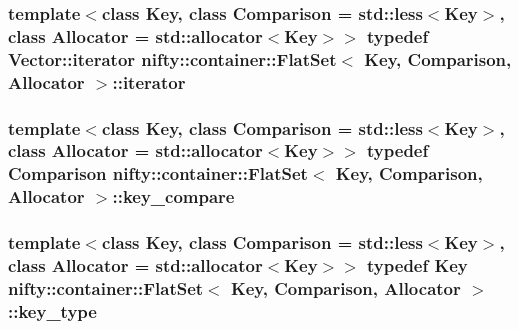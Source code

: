 \subsubsection[{iterator}]{\setlength{\rightskip}{0pt plus 5cm}template$<$class Key, class Comparison = std\+::less$<$\+Key$>$, class Allocator = std\+::allocator$<$\+Key$>$$>$ typedef Vector\+::iterator {\bf nifty\+::container\+::\+Flat\+Set}$<$ Key, Comparison, Allocator $>$\+::{\bf iterator}}\label{classnifty_1_1container_1_1FlatSet_a9c7fd20cd6b1878ccb8a7e068072c795}
\hypertarget{classnifty_1_1container_1_1FlatSet_ab88802e81d77a08a7a74e8ba9d2083c7}{}
\subsubsection[{key\+\_\+compare}]{\setlength{\rightskip}{0pt plus 5cm}template$<$class Key, class Comparison = std\+::less$<$\+Key$>$, class Allocator = std\+::allocator$<$\+Key$>$$>$ typedef Comparison {\bf nifty\+::container\+::\+Flat\+Set}$<$ Key, Comparison, Allocator $>$\+::{\bf key\+\_\+compare}}\label{classnifty_1_1container_1_1FlatSet_ab88802e81d77a08a7a74e8ba9d2083c7}
\hypertarget{classnifty_1_1container_1_1FlatSet_a0101a4574052389646be8d9bf092a949}{}
\subsubsection[{key\+\_\+type}]{\setlength{\rightskip}{0pt plus 5cm}template$<$class Key, class Comparison = std\+::less$<$\+Key$>$, class Allocator = std\+::allocator$<$\+Key$>$$>$ typedef Key {\bf nifty\+::container\+::\+Flat\+Set}$<$ Key, Comparison, Allocator $>$\+::{\bf key\+\_\+type}}\label{classnifty_1_1container_1_1FlatSet_a0101a4574052389646be8d9bf092a949}
\hypertarget{classnifty_1_1container_1_1FlatSet_a5ad537835e3b8911ac1beed1a95d3ac2}{}
